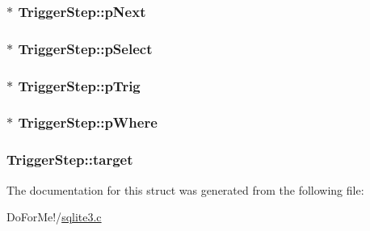 \hypertarget{struct_trigger_step_a0757a0d22dbe2f7f57706014dd35759b}{
\subsubsection[{p\-Next}]{$\ast$ Trigger\-Step\-::p\-Next}}\label{struct_trigger_step_a0757a0d22dbe2f7f57706014dd35759b}
\hypertarget{struct_trigger_step_a90bf3353653cedf364a7fb2eb89a19c4}{
\subsubsection[{p\-Select}]{$\ast$ Trigger\-Step\-::p\-Select}}\label{struct_trigger_step_a90bf3353653cedf364a7fb2eb89a19c4}
\hypertarget{struct_trigger_step_a70671e85796776db06c732ab6ae4ae0d}{
\subsubsection[{p\-Trig}]{$\ast$ Trigger\-Step\-::p\-Trig}}\label{struct_trigger_step_a70671e85796776db06c732ab6ae4ae0d}
\hypertarget{struct_trigger_step_ad4c293b04dfda535f3aad5b9e02726c7}{
\subsubsection[{p\-Where}]{$\ast$ Trigger\-Step\-::p\-Where}}\label{struct_trigger_step_ad4c293b04dfda535f3aad5b9e02726c7}
\hypertarget{struct_trigger_step_a8b860bb5f466b1522125d446b58d860a}{
\subsubsection[{target}]{ Trigger\-Step\-::target}}\label{struct_trigger_step_a8b860bb5f466b1522125d446b58d860a}


The documentation for this struct was generated from the following file\-:\begin{DoxyCompactItemize}
\item 
Do\-For\-Me!/\hyperlink{sqlite3_8c}{sqlite3.\-c}\end{DoxyCompactItemize}
